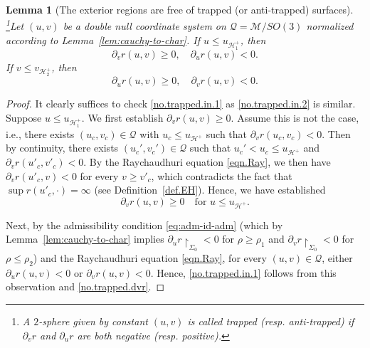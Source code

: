 \documentclass[10pt, reqno]{amsart}
\newtheorem{lemma}[theorem]{Lemma}
\theoremstyle{definition}
\theoremstyle{remark}
\numberwithin{equation}{section}
\newcommand{\rd}{\partial}
\newcommand{\0}{\emptyset}
\newcommand{\calH}{\mathcal H}
\newcommand{\calM}{\mathcal M}
\newcommand{\calQ}{\mathcal Q}
\newcommand{\EH}{\calH^{+}}
\begin{document}
\begin{lemma}[The exterior regions are free of trapped (or anti-trapped) surfaces]\footnote{A $2$-sphere given by constant $(u,v)$ is called \emph{trapped} (resp. \emph{anti-trapped}) if $\rd_v r$ and $\rd_u r$ are both negative (resp. positive).}\label{no.trapped}
Let $(u, v)$ be a double null coordinate system on $\calQ = \calM / SO(3)$ normalized according to Lemma~\ref{lem:cauchy-to-char}. If $u\leq u_{\EH_1}$, then
\begin{equation}\label{no.trapped.in.1}
\rd_v r(u,v)\geq 0,\quad \rd_u r(u,v) < 0.
\end{equation}
If $v\leq v_{\EH_2}$, then
\begin{equation}\label{no.trapped.in.2}
\rd_u r(u,v)\geq 0,\quad \rd_v r(u,v) < 0.
\end{equation}
\end{lemma}
\begin{proof}
It clearly suffices to check \eqref{no.trapped.in.1} as \eqref{no.trapped.in.2} is similar. Suppose $u\leq u_{\EH_1}$. We first establish $\rd_v r(u, v)\geq 0$. Assume this is not the case, i.e., there exists $(u_c,v_c) \in \calQ$ with $u_c\leq u_{\EH}$ such that $\rd_v r(u_c, v_c)<0$. Then by continuity, there exists $(u_{c}', v_{c}') \in \calQ$ such that $u_c'<u_c\leq u_{\mathcal H^+}$ and $\rd_v r(u'_c, v'_c)<0$. By the Raychaudhuri equation \eqref{eqn.Ray}, we then have $\rd_v r(u'_c, v)<0$ for every $v\geq v'_c$, which contradicts the fact that $\sup r(u'_c, \cdot) = \infty$ (see Definition~\ref{def.EH}). Hence, we have established
\begin{equation}\label{no.trapped.dvr}
\rd_v r (u,v) \geq 0\quad\mbox{for }u\leq u_{\EH}.
\end{equation}

Next, by the admissibility condition \eqref{eq:adm-id-adm} (which by Lemma~\ref{lem:cauchy-to-char} implies $\rd_u r\restriction_{\Sigma_0}<0$ for $\rho \geq \rho_1$ and $\rd_v r\restriction_{\Sigma_0}<0$ for $\rho \leq \rho_2$) and the Raychaudhuri equation \eqref{eqn.Ray}, for every $(u,v)\in \mathcal Q$, either $\rd_u r(u,v)<0$ or $\rd_v r (u,v)<0$. Hence, \eqref{no.trapped.in.1} follows from this observation and \eqref{no.trapped.dvr}.
\end{proof}
\end{document}
